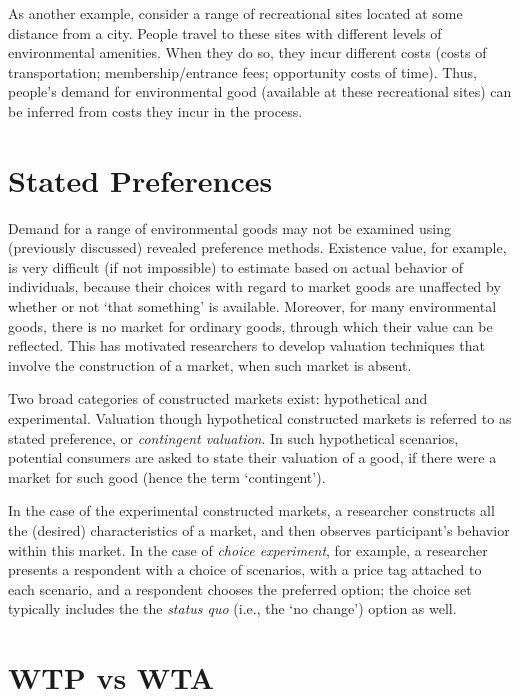 \documentclass[
]{book}
\begin{document}
As another example, consider a range of recreational sites located at some distance from a city. People travel to these sites with different levels of environmental amenities. When they do so, they incur different costs (costs of transportation; membership/entrance fees; opportunity costs of time). Thus, people's demand for environmental good (available at these recreational sites) can be inferred from costs they incur in the process.

\hypertarget{stated-preferences}{%
\section{Stated Preferences}\label{stated-preferences}}

Demand for a range of environmental goods may not be examined using (previously discussed) revealed preference methods. Existence value, for example, is very difficult (if not impossible) to estimate based on actual behavior of individuals, because their choices with regard to market goods are unaffected by whether or not `that something' is available. Moreover, for many environmental goods, there is no market for ordinary goods, through which their value can be reflected. This has motivated researchers to develop valuation techniques that involve the construction of a market, when such market is absent.

Two broad categories of constructed markets exist: hypothetical and experimental. Valuation though hypothetical constructed markets is referred to as stated preference, or \emph{contingent valuation}. In such hypothetical scenarios, potential consumers are asked to state their valuation of a good, if there were a market for such good (hence the term `contingent').

In the case of the experimental constructed markets, a researcher constructs all the (desired) characteristics of a market, and then observes participant's behavior within this market. In the case of \emph{choice experiment}, for example, a researcher presents a respondent with a choice of scenarios, with a price tag attached to each scenario, and a respondent chooses the preferred option; the choice set typically includes the the \emph{status quo} (i.e., the `no change') option as well.

\hypertarget{wtp-vs-wta}{%
\section{WTP vs WTA}\label{wtp-vs-wta}}
\end{document}
